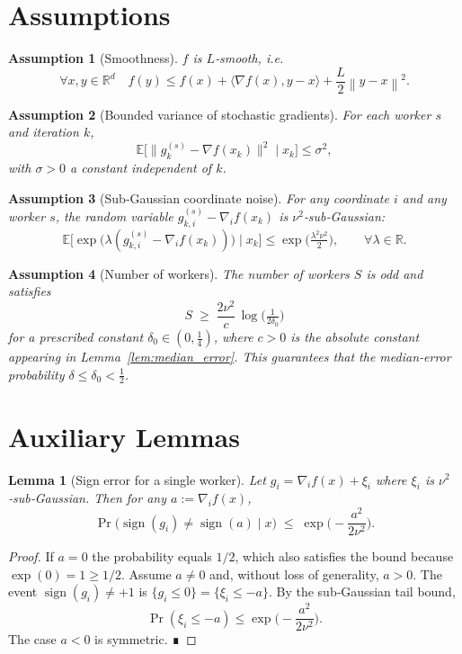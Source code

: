 \documentclass[11pt]{article}
\newcommand{\E}{\mathbb{E}}
\newcommand{\R}{\mathbb{R}}
\newcommand{\sign}{\operatorname{sign}}
\newcommand{\norm}[1]{\left\lVert #1\right\rVert}
\newtheorem{lemma}{Lemma}
\newtheorem{assumption}{Assumption}
\begin{document}
\section*{Assumptions}
\begin{assumption}[Smoothness]\label{ass:smooth}
$f$ is $L$‑smooth, i.e.
\[
    \forall x,y\in\R^{d}\quad
    f(y)\le f(x)+\langle \nabla f(x),y-x\rangle+\frac{L}{2}\norm{y-x}^{2}.
\]
\end{assumption}
\begin{assumption}[Bounded variance of stochastic gradients]\label{ass:var}
For each worker $s$ and iteration $k$,
\[
    \E\!\big[\|g^{(s)}_{k}-\nabla f(x_{k})\|^{2}\mid x_{k}\big]\le \sigma^{2},
\]
with $\sigma>0$ a constant independent of $k$.
\end{assumption}
\begin{assumption}[Sub‑Gaussian coordinate noise]\label{ass:subg}
For any coordinate $i$ and any worker $s$, the random variable
$g^{(s)}_{k,i}-\nabla_{i}f(x_{k})$ is $\nu^{2}$‑sub‑Gaussian:
\[
    \E\!\Big[\exp\big(\lambda (g^{(s)}_{k,i}-\nabla_{i}f(x_{k}))\big)\mid x_{k}\Big]
    \le \exp\!\big(\tfrac{\lambda^{2}\nu^{2}}{2}\big),\qquad\forall\lambda\in\R .
\]
\end{assumption}
\begin{assumption}[Number of workers]\label{ass:workers}
The number of workers $S$ is odd and satisfies
\[
    S\;\ge\; \frac{2\nu^{2}}{c}\,\log\!\big(\tfrac{1}{2\delta_{0}}\big)
\]
for a prescribed constant $\delta_{0}\in(0,\tfrac14)$, where $c>0$ is the absolute
constant appearing in Lemma~\ref{lem:median_error}.  This guarantees that the
median‑error probability $\delta\le\delta_{0}<\tfrac12$.
\end{assumption}

\section*{Auxiliary Lemmas}
\begin{lemma}[Sign error for a single worker]\label{lem:single_sign}
Let $g_{i}= \nabla_{i}f(x)+\xi_{i}$ where $\xi_{i}$ is $\nu^{2}$‑sub‑Gaussian.
Then for any $a:=\nabla_{i}f(x)$,
\[
    \Pr\!\big(\sign(g_{i})\neq\sign(a)\mid x\big)
    \;\le\;
    \exp\!\Big(-\frac{a^{2}}{2\nu^{2}}\Big).
\]
\end{lemma}
\begin{proof}
If $a=0$ the probability equals $1/2$, which also satisfies the bound because
$\exp(0)=1\ge 1/2$.  Assume $a\neq0$ and, without loss of generality, $a>0$.
The event $\sign(g_{i})\neq+1$ is $\{g_{i}\le0\}=\{\xi_{i}\le -a\}$.
By the sub‑Gaussian tail bound,
\[
    \Pr(\xi_{i}\le -a)\le \exp\!\Big(-\frac{a^{2}}{2\nu^{2}}\Big).
\]
The case $a<0$ is symmetric. ∎
\end{proof}
\end{document}
